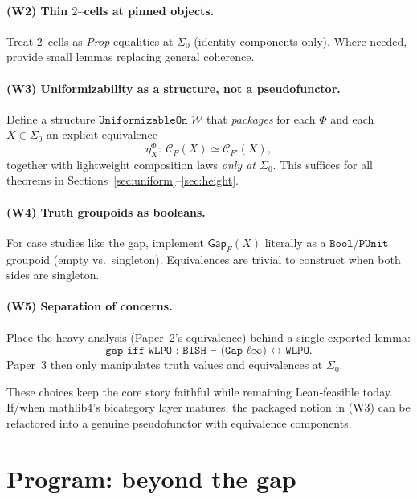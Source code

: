 \documentclass[11pt]{article}
\theoremstyle{definition}
\theoremstyle{remark}
\newcommand{\SigmaZero}{\Sigma_{0}}
\begin{document}
\paragraph{(W2) Thin $2$--cells at pinned objects.}
Treat $2$--cells as \emph{Prop} equalities at \(\SigmaZero\) (identity components only). Where needed, provide small lemmas replacing general coherence.

\paragraph{(W3) Uniformizability as a structure, not a pseudofunctor.}
Define a structure \(\texttt{UniformizableOn } \mathcal W\) that \emph{packages} for each \(\Phi\) and each \(X\in\SigmaZero\) an explicit equivalence
\[
  \eta^\Phi_X:\ \mathcal C_F(X)\simeq\mathcal C_{F'}(X),
\]
together with lightweight composition laws \emph{only at \(\SigmaZero\)}. This suffices for all theorems in Sections~\ref{sec:uniform}--\ref{sec:height}.

\paragraph{(W4) Truth groupoids as booleans.}
For case studies like the gap, implement \(\mathsf{Gap}_F(X)\) literally as a \(\texttt{Bool}\)/\(\texttt{PUnit}\) groupoid (empty vs.\ singleton). Equivalences are trivial to construct when both sides are singleton.

\paragraph{(W5) Separation of concerns.}
Place the heavy analysis (Paper~2’s equivalence) behind a single exported lemma:
\[
  \texttt{gap\_iff\_WLPO : BISH ⊢ (Gap\_ℓ∞) ↔ WLPO.}
\]
Paper~3 then only manipulates truth values and equivalences at \(\SigmaZero\).

\medskip
\noindent
These choices keep the core story faithful while remaining Lean‑feasible today. If/when mathlib4’s bicategory layer matures, the packaged notion in (W3) can be refactored into a genuine pseudofunctor with equivalence components.

\section{Program: beyond the gap}\label{sec:program}
\end{document}
